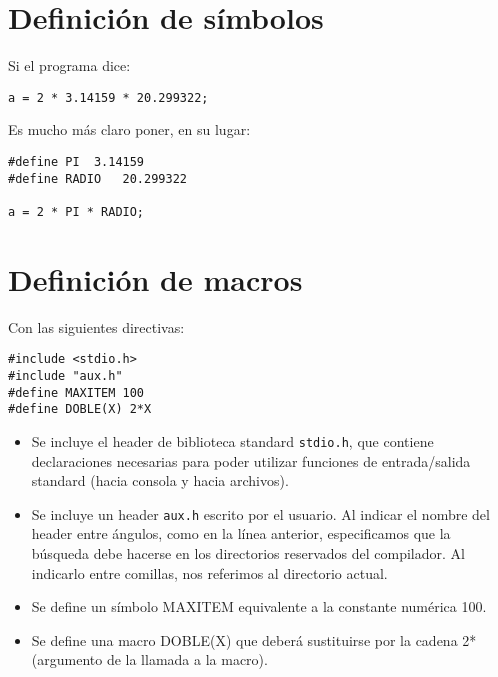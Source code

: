 
\section{Definición de símbolos}

Si el programa dice:
\begin{lstlisting}
a = 2 * 3.14159 * 20.299322;
\end{lstlisting}
Es mucho más claro poner, en su lugar:
\begin{lstlisting}
#define PI	3.14159
#define RADIO	20.299322

a = 2 * PI * RADIO;
\end{lstlisting}



\section{Definición de macros}
Con las siguientes directivas:
\begin{lstlisting}
#include <stdio.h>
#include "aux.h"
#define MAXITEM 100
#define DOBLE(X) 2*X
\end{lstlisting}

\begin{itemize}
	\item Se incluye el header de biblioteca standard \texttt{stdio.h}, que contiene declaraciones necesarias para
poder utilizar funciones de entrada/salida standard (hacia consola y hacia archivos).
\item Se incluye un header \texttt{aux.h} escrito por el usuario. Al indicar el nombre del header entre ángulos, como en la línea anterior, especificamos que la búsqueda debe hacerse en los directorios reservados del compilador. Al indicarlo entre comillas, nos referimos al directorio actual.
\item Se define un símbolo MAXITEM equivalente a la constante numérica 100.
\item Se define una macro DOBLE(X) que deberá sustituirse por la cadena 2*(argumento de la llamada
a la macro).
\end{itemize}


